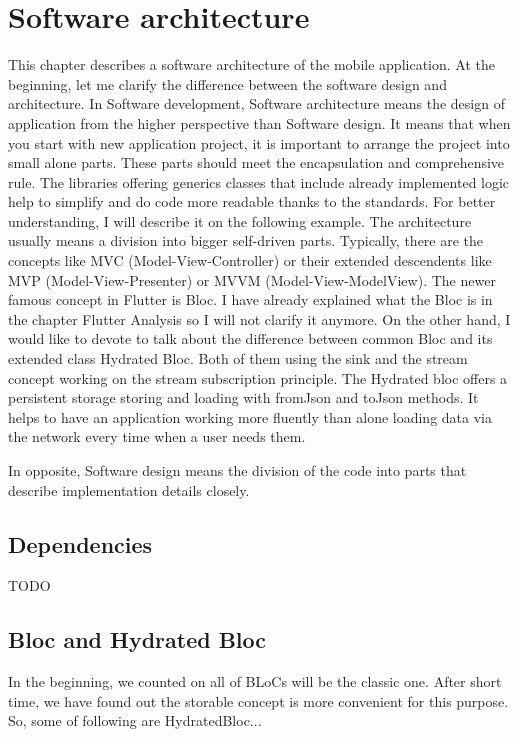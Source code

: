 \chapter{Software architecture}\label{ch:software-architecture}
This chapter describes a software architecture of the mobile application.
At the beginning, let me clarify the difference between the software design and architecture.
In Software development, Software architecture means the design of application from the higher perspective than Software design.
It means that when you start with new application project, it is important to arrange the project into small alone parts.
These parts should meet the encapsulation and comprehensive rule.
The libraries offering generics classes that include already implemented logic help to simplify and do code more readable thanks to the standards.
For better understanding, I will describe it on the following example.
The architecture usually means a division into bigger self-driven parts.
Typically, there are the concepts like MVC (Model-View-Controller) or their extended descendents like MVP (Model-View-Presenter) or MVVM (Model-View-ModelView).
The newer famous concept in Flutter is Bloc.
I have already explained what the Bloc is in the chapter Flutter Analysis so I will not clarify it anymore. %
On the other hand, I would like to devote to talk about the difference between common Bloc and its extended class Hydrated Bloc.
Both of them using the sink and the stream concept working on the stream subscription principle.
The Hydrated bloc offers a persistent storage storing and loading with fromJson and toJson methods.
It helps to have an application working more fluently than alone loading data via the network every time when a user needs them.

In opposite, Software design means the division of the code into parts that describe implementation details closely.

\section{Dependencies}\label{sec:dependencies}
TODO

\section{Bloc and Hydrated Bloc}\label{sec:bloc-and-hydrated-bloc}
In the beginning, we counted on all of BLoCs will be the classic one.
After short time, we have found out the storable concept is more convenient for this purpose.
So, some of following are HydratedBloc...

